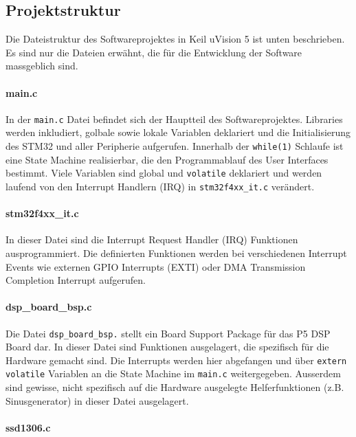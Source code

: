 \subsection{Projektstruktur}
\label{sec:SWProjekt}

Die Dateistruktur des Softwareprojektes in Keil uVision 5 ist unten beschrieben. 
Es sind nur die Dateien erwähnt, die für die Entwicklung der Software massgeblich sind.


\paragraph{main.c}

In der \texttt{main.c} Datei befindet sich der Hauptteil des Softwareprojektes.
Libraries werden inkludiert, golbale sowie lokale Variablen deklariert und die Initialisierung des STM32 und aller Peripherie aufgerufen.
Innerhalb der \texttt{while(1)} Schlaufe ist eine State Machine realisierbar, die den Programmablauf des User Interfaces bestimmt.
Viele Variablen sind global und \texttt{volatile} deklariert und werden laufend von den Interrupt Handlern (IRQ) in \texttt{stm32f4xx\_it.c} verändert.


\paragraph{stm32f4xx\_it.c}

In dieser Datei sind die Interrupt Request Handler (IRQ) Funktionen ausprogrammiert.
Die definierten Funktionen werden bei verschiedenen Interrupt Events wie externen GPIO Interrupts (EXTI) oder DMA Transmission Completion Interrupt aufgerufen.


\paragraph{dsp\_board\_bsp.c}

Die Datei \texttt{dsp\_board\_bsp.} stellt ein Board Support Package für das P5 DSP Board dar.
In dieser Datei sind Funktionen ausgelagert, die spezifisch für die Hardware gemacht sind.
Die Interrupts werden hier abgefangen und über \texttt{extern volatile} Variablen an die State Machine im \texttt{main.c} weitergegeben.
Ausserdem sind gewisse, nicht spezifisch auf die Hardware ausgelegte Helferfunktionen (z.B. Sinusgenerator) in dieser Datei ausgelagert.


\paragraph{ssd1306.c}

